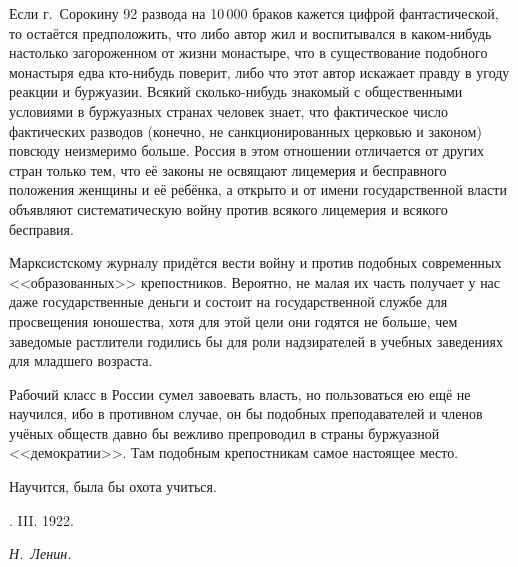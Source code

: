 Если г.~Сорокину 92 развода на 10\,000 браков кажется
цифрой фантастической, то остаётся предположить, что либо автор жил и
воспитывался в каком-нибудь настолько загороженном от жизни монастыре, что
в существование подобного монастыря едва кто-нибудь поверит, либо что этот
автор искажает правду в угоду реакции и буржуазии. Всякий сколько-нибудь
знакомый с общественными условиями в буржуазных странах человек знает, что
фактическое число фактических разводов (конечно, не санкционированных
церковью и законом) повсюду неизмеримо больше. Россия в этом отношении
отличается от других стран только тем, что её законы не освящают лицемерия
и бесправного положения женщины и её ребёнка, а открыто и от имени
государственной власти объявляют систематическую войну против всякого
лицемерия и всякого бесправия.

Марксистскому журналу придётся вести войну и против подобных современных
<<образованных>> крепостников. Вероятно, не малая их часть получает у нас даже
государственные деньги и состоит на государственной службе для просвещения
юношества, хотя для этой цели они годятся не больше, чем заведомые
растлители годились бы для роли надзирателей в учебных заведениях для
младшего возраста.

Рабочий класс в России сумел завоевать власть, но пользоваться ею ещё не
научился, ибо в противном случае, он бы подобных преподавателей и членов
учёных обществ давно бы вежливо препроводил в страны буржуазной
<<демократии>>. Там подобным крепостникам самое настоящее место.

\nopagebreak
Научится, была бы охота учиться.

\nopagebreak \medskip
{}. III. 1922.
\nopagebreak \medskip

{\raggedleft \textit{Н.~Ленин.} \par}

\nopagebreak \medskip
\sectionline

\bigskip
